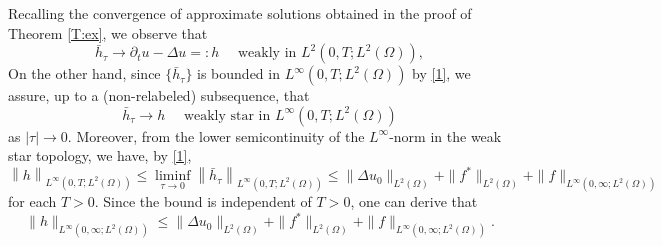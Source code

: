 \documentclass[reqno,10pt]{amsart}
\begin{document}
Recalling the convergence of approximate solutions obtained in the proof
of Theorem \ref{T:ex}, we observe that
$$
\bar h_\tau \to \partial_t u - \Delta u =: h \quad \mbox{ weakly in }
 L^2(0,T;L^2(\Omega)), 
$$
On the other hand, since $\{\bar h_\tau\}$ is bounded in
$L^\infty(0,T;L^2(\Omega))$ by \eqref{1}, we assure, up to a
(non-relabeled) subsequence, that
$$
\bar h_\tau \to h \quad \mbox{ weakly star in }
L^\infty(0,T;L^2(\Omega))
$$
as $|\tau| \to 0$. Moreover, from the lower
 semicontinuity of the $L^\infty$-norm in the weak star topology, we
 have, by \eqref{1},
$$
 \left\| h \right\|_{L^\infty(0,T;L^2(\Omega))}
 \leq \liminf_{\tau \to 0}
 \left\| \bar h_\tau \right\|_{L^\infty(0,T;L^2(\Omega))}
  \leq \|\Delta u_0\|_{L^2(\Omega)} + \|f^*\|_{L^2(\Omega)}
+ \|f\|_{L^\infty(0,\infty;L^2(\Omega))} 
$$
for each $T > 0$. Since the bound is independent of $T > 0$,
 one can derive that 
\begin{equation}\label{e:g-i:i}
\|h \|_{L^\infty(0,\infty;L^2(\Omega))} \leq 
\|\Delta u_0\|_{L^2(\Omega)} + \|f^*\|_{L^2(\Omega)}
+ \|f\|_{L^\infty(0,\infty;L^2(\Omega))}. 
\end{equation}
\end{document}
